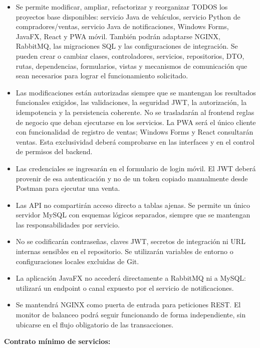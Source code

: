 \documentclass[11pt,a4paper]{article}
\renewcommand{\_}{\oldunderscore\allowbreak}
\begin{document}
\begin{itemize}[leftmargin=*,itemsep=2pt,topsep=2pt]
  \item Se permite modificar, ampliar, refactorizar y reorganizar TODOS los proyectos base disponibles: servicio Java de vehículos, servicio Python de compradores/ventas, servicio Java de notificaciones, Windows Forms, JavaFX, React y PWA móvil. También podrán adaptarse NGINX, RabbitMQ, las migraciones SQL y las configuraciones de integración. Se pueden crear o cambiar clases, controladores, servicios, repositorios, DTO, rutas, dependencias, formularios, vistas y mecanismos de comunicación que sean necesarios para lograr el funcionamiento solicitado.
  \item Las modificaciones están autorizadas siempre que se mantengan los resultados funcionales exigidos, las validaciones, la seguridad JWT, la autorización, la idempotencia y la persistencia coherente. No se trasladarán al frontend reglas de negocio que deban ejecutarse en los servicios. La PWA será el único cliente con funcionalidad de registro de ventas; Windows Forms y React consultarán ventas. Esta exclusividad deberá comprobarse en las interfaces y en el control de permisos del backend.
  \item Las credenciales se ingresarán en el formulario de login móvil. El JWT deberá provenir de esa autenticación y no de un token copiado manualmente desde Postman para ejecutar una venta.
  \item Las API no compartirán acceso directo a tablas ajenas. Se permite un único servidor MySQL con esquemas lógicos separados, siempre que se mantengan las responsabilidades por servicio.
  \item No se codificarán contraseñas, claves JWT, secretos de integración ni URL internas sensibles en el repositorio. Se utilizarán variables de entorno o configuraciones locales excluidas de Git.
  \item La aplicación JavaFX no accederá directamente a RabbitMQ ni a MySQL: utilizará un endpoint o canal expuesto por el servicio de notificaciones.
  \item Se mantendrá NGINX como puerta de entrada para peticiones REST. El monitor de balanceo podrá seguir funcionando de forma independiente, sin ubicarse en el flujo obligatorio de las transacciones.
\end{itemize}

\vspace{0.2cm}

\noindent\textbf{Contrato mínimo de servicios:}
\end{document}
